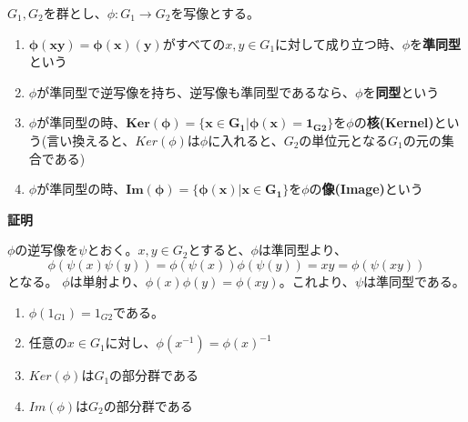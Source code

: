\documentclass[dvipdfmx,autodetect-engine]{jsarticle}
\begin{document}
 $G_1, G_2$を群とし、$\phi: G_1 \to G_2$を写像とする。

\begin{enumerate}
\renewcommand{\labelenumi}{(\arabic{enumi})}
\item $\boldsymbol{\phi(xy) = \phi(x)(y)}$がすべての$x, y \in G_1$に対して成り立つ時、$\phi$を{\bf 準同型}という
\item $\phi$が準同型で逆写像を持ち、逆写像も準同型であるなら、$\phi$を{\bf 同型}という
\item $\phi$が準同型の時、$\boldsymbol{Ker(\phi) = \{x \in G_1 | \phi(x) = 1_{G2}}\}$を$\phi$の{\bf 核(Kernel)}という(言い換えると、$Ker(\phi)$は$\phi$に入れると、$G_2$の単位元となる$G_1$の元の集合である)
\item $\phi$が準同型の時、$\boldsymbol{Im(\phi) = \{\phi(x) | x \in G_1\}}$を$\phi$の{\bf 像(Image)}という
\end{enumerate}

\label{prop:isomorphic}

{\bf 証明}

$\phi$の逆写像を$\psi$とおく。$x, y \in G_2$とすると、$\phi$は準同型より、
$$
\phi(\psi(x)\psi(y)) = \phi(\psi(x))\phi(\psi(y)) = xy = \phi(\psi(xy))
$$
となる。
$\phi$は単射より、$\phi(x)\phi(y) = \phi(xy)$。これより、$\psi$は準同型である。


\label{prop:homomorphism}

\begin{enumerate}
\renewcommand{\labelenumi}{(\arabic{enumi})}
\item $\phi(1_{G1}) = 1_{G2}$である。
\item 任意の$x \in G_1$に対し、$\phi(x^{-1}) = \phi(x)^{-1}$
\item $Ker(\phi)$は$G_1$の部分群である
\item $Im(\phi)$は$G_2$の部分群である
\end{enumerate}
\end{document}
